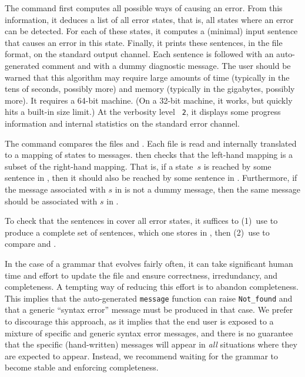 \documentclass[onecolumn,11pt,nocopyrightspace,preprint]{sigplanconf}
\begin{document}
The command \olisterrors first computes all possible ways of causing an error.
From this information, it deduces a list of all error states, that is, all
states where an error can be detected. For each of these states, it computes a
(minimal) input sentence that causes an error in this state. Finally, it
prints these sentences, in the \messages file format, on the standard output
channel. Each sentence is followed with an auto-generated comment and with a
dummy diagnostic message. The user should be warned that this algorithm may
require large amounts of time (typically in the tens of seconds, possibly
more) and memory (typically in the gigabytes, possibly more). It requires a
64-bit machine. (On a 32-bit machine, it works, but quickly hits a built-in
size limit.) At the verbosity level \ologautomaton~\texttt{2}, it displays
some progress information and internal statistics on the standard error
channel.

The command \ocompareerrors {} \ocompareerrors {}
compares the \messages files  and . Each file is
read and internally translated to a mapping of states to messages. \menhir
then checks that the left-hand mapping is a subset of the right-hand mapping.
That is, if a state~$s$ is reached by some sentence in , then it
should also be reached by some sentence in . Furthermore, if the
message associated with $s$ in  is not a dummy message, then the
same message should be associated with $s$ in .

To check that the sentences in  cover all error states, it
suffices to (1)~use \olisterrors to produce a complete set of sentences,
which one stores in , then (2)~use \ocompareerrors to
compare  and .

In the case of a grammar that evolves fairly often, it can take significant
human time and effort to update the \messages file and ensure correctness,
irredundancy, and completeness. A tempting way of reducing this effort is to abandon
completeness. This implies that the auto-generated \verb+message+ function can
raise \verb+Not_found+ and that a generic ``syntax error'' message must be
produced in that case. We prefer to discourage this approach, as it implies
that the end user is exposed to a mixture of specific and generic syntax error
messages, and there is no guarantee that the specific (hand-written) messages
will appear in \emph{all} situations where they are expected to appear.
Instead, we recommend waiting for the grammar to become stable and enforcing
completeness.
\end{document}
